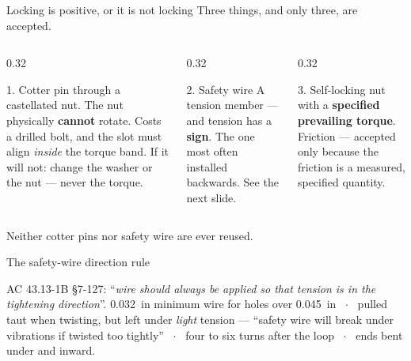 \documentclass[aspectratio=169,10pt]{beamer}
\begin{document}
\begin{frame}{Locking is positive, or it is not locking}
Three things, and only three, are accepted.
\vfill
\begin{columns}[T]
\begin{column}{0.32\textwidth}
\begin{block}{1. Cotter pin}
through a castellated nut. The nut physically \textbf{cannot} rotate.
\vspace{2pt}
{\scriptsize Costs a drilled bolt, and the slot must align \emph{inside} the torque band. If it
will not: change the washer or the nut --- never the torque.}
\end{block}
\end{column}
\begin{column}{0.32\textwidth}
\begin{block}{2. Safety wire}
A tension member --- and tension has a \textbf{sign}.
\vspace{2pt}
{\scriptsize The one most often installed backwards. See the next slide.}
\end{block}
\end{column}
\begin{column}{0.32\textwidth}
\begin{block}{3. Self-locking nut}
with a \textbf{specified prevailing torque}.
\vspace{2pt}
{\scriptsize Friction --- accepted only because the friction is a measured, specified quantity.}
\end{block}
\end{column}
\end{columns}
\vfill
\centering
Neither cotter pins nor safety wire are ever reused.
\end{frame}

\begin{frame}{The safety-wire direction rule}
\centering
\resizebox{!}{3.6cm}{}
\vfill
\raggedright
AC 43.13-1B \S7-127: ``\emph{wire should always be applied so that tension is in the tightening
direction}''.
\vfill
{\footnotesize \SI{0.032}{in} minimum wire for holes over \SI{0.045}{in} \ $\cdot$ \ pulled taut
when twisting, but left under \emph{light} tension --- ``safety wire will break under vibrations if
twisted too tightly'' \ $\cdot$ \ four to six turns after the loop \ $\cdot$ \ ends bent under and
inward.}
\end{frame}
\end{document}
